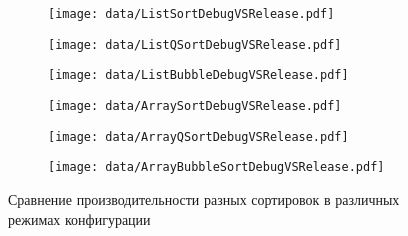 \begin{figure}[H]
	\centering
	\begin{subfigure}[b]{0.40\textwidth}
       \centering
	   \texttt{[image: data/ListSortDebugVSRelease.pdf]}
	   \label{fig:ListSortDebugVSRelease}
	\end{subfigure}
	\begin{subfigure}[b]{0.40\textwidth}
       \centering
	   \texttt{[image: data/ListQSortDebugVSRelease.pdf]}
	   \label{fig:ListQSortDebugVSRelease}
	\end{subfigure}
	\begin{subfigure}[b]{0.40\textwidth}
       \centering
	   \texttt{[image: data/ListBubbleDebugVSRelease.pdf]}
	   \label{fig:ListBubbleDebugVSRelease}
	\end{subfigure}
	\begin{subfigure}[b]{0.40\textwidth}
       \centering
	   \texttt{[image: data/ArraySortDebugVSRelease.pdf]}
	   \label{fig:ArraySortDebugVSRelease}
	\end{subfigure}
	\begin{subfigure}[b]{0.40\textwidth}
       \centering
	   \texttt{[image: data/ArrayQSortDebugVSRelease.pdf]}
	   \label{fig:ArrayQSortDebugVSRelease}
	\end{subfigure}
	\begin{subfigure}[b]{0.40\textwidth}
       \centering
	   \texttt{[image: data/ArrayBubbleSortDebugVSRelease.pdf]}
	   \label{fig:ArrayBubbleSortDebugVSRelease}
	\end{subfigure}
	\caption{Сравнение производительности разных сортировок в различных режимах конфигурации}
	\label{fig:DebugVSRelease}
\end{figure}

